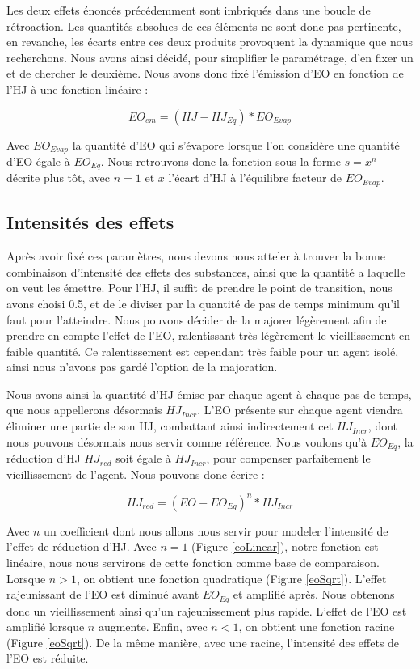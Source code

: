 	Les deux effets énoncés précédemment sont imbriqués dans une boucle de rétroaction. Les quantités absolues de ces éléments ne sont donc pas pertinente, en revanche, les écarts entre ces deux produits provoquent la dynamique que nous recherchons. Nous avons ainsi décidé, pour simplifier le paramétrage, d'en fixer un et de chercher le deuxième. Nous avons donc fixé l'émission d'EO en fonction de l'HJ à une fonction linéaire :
	
	\begin{equation}
		EO_{em} = (HJ - HJ_{Eq}) * EO_{Evap}
	\label{eoEM}
	\end{equation}

Avec $EO_{Evap}$ la quantité d'EO qui s'évapore lorsque l'on considère une quantité d'EO égale à $EO_{Eq}$. Nous retrouvons donc la fonction sous la forme $s=x^n$ décrite plus tôt, avec $n = 1$ et $x$ l'écart d'HJ à l'équilibre facteur de $EO_{Evap}$.
	
	
	\subsection{Intensités des effets}	
	Après avoir fixé ces paramètres, nous devons nous atteler à trouver la bonne combinaison d'intensité des effets des substances, ainsi que la quantité a laquelle on veut les émettre. Pour l'HJ, il suffit de prendre le point de transition, nous avons choisi 0.5, et de le diviser par la quantité de pas de temps minimum qu'il faut pour l'atteindre. Nous pouvons décider de la majorer légèrement afin de prendre en compte l'effet de l'EO, ralentissant très légèrement le vieillissement en faible quantité. Ce ralentissement est cependant très faible pour un agent isolé, ainsi nous n'avons pas gardé l'option de la majoration.
	
	Nous avons ainsi la quantité d'HJ émise par chaque agent à chaque pas de temps, que nous appellerons désormais $HJ_{Incr}$. L'EO présente sur chaque agent viendra éliminer une partie de son HJ, combattant ainsi indirectement cet $HJ_{Incr}$, dont nous pouvons désormais nous servir comme référence. Nous voulons qu'à $EO_{Eq}$, la réduction d'HJ $HJ_{red}$ soit égale à $HJ_{Incr}$, pour compenser parfaitement le vieillissement de l'agent. Nous pouvons donc écrire :
	
	\begin{equation}
		 HJ_{red} = (EO - EO_{Eq})^n * HJ_{Incr}
	\label{hjRED}
	\end{equation}
	
	Avec $n$ un coefficient dont nous allons nous servir pour modeler l'intensité de l'effet de réduction d'HJ. Avec $n=1$ (Figure \ref{eoLinear}), notre fonction est linéaire, nous nous servirons de cette fonction comme base de comparaison. Lorsque $n>1$, on obtient une fonction quadratique (Figure \ref{eoSqrt}). L'effet rajeunissant de l'EO est diminué avant $EO_{Eq}$ et amplifié après. Nous obtenons donc un vieillissement ainsi qu'un rajeunissement plus rapide. L'effet de l'EO est amplifié lorsque $n$ augmente. Enfin, avec $n < 1$, on obtient une fonction racine (Figure \ref{eoSqrt}). De la même manière, avec une racine, l'intensité des effets de l'EO est réduite.
	
